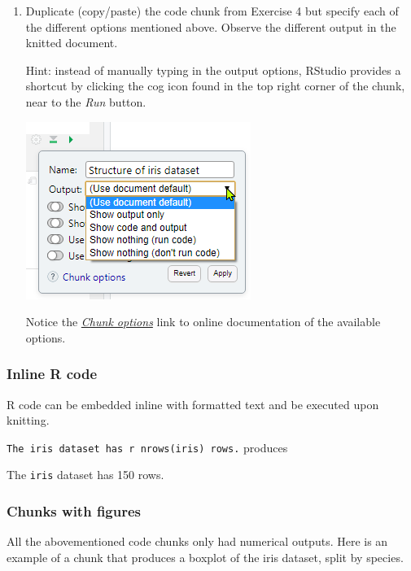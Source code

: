 \documentclass[]{article}
\begin{document}
\begin{enumerate}
\def\labelenumi{\arabic{enumi}.}
\item
  Duplicate (copy/paste) the code chunk from Exercise 4 but specify each
  of the different options mentioned above. Observe the different output
  in the knitted document.

  Hint: instead of manually typing in the output options, RStudio
  provides a shortcut by clicking the cog icon found in the top right
  corner of the chunk, near to the \emph{Run} button.

  \includegraphics{./chunkoptions.png}

  Notice the \href{https://yihui.name/knitr/options/}{\emph{Chunk
  options}} link to online documentation of the available options.
\end{enumerate}

\hypertarget{inline-r-code}{%
\subsubsection{Inline R code}\label{inline-r-code}}

R code can be embedded inline with formatted text and be executed upon
knitting.

\texttt{The\ \textasciigrave{}iris\textasciigrave{}\ dataset\ has\ \textasciigrave{}r\ nrows(iris)\textasciigrave{}\ rows.}
produces

The \texttt{iris} dataset has 150 rows.

\hypertarget{chunks-with-figures}{%
\subsubsection{Chunks with figures}\label{chunks-with-figures}}

All the abovementioned code chunks only had numerical outputs. Here is
an example of a chunk that produces a boxplot of the iris dataset, split
by species.
\end{document}
